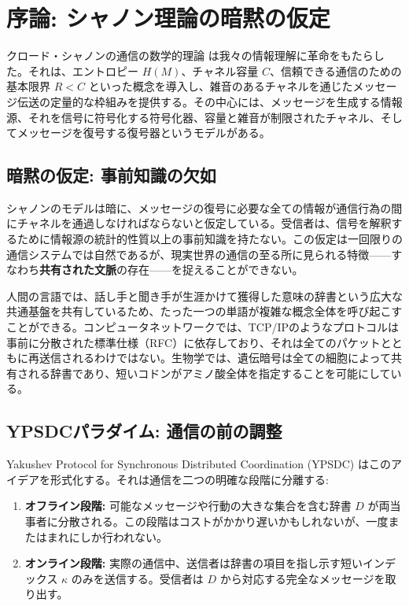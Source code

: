 \documentclass[12pt,a4paper]{article}
\theoremstyle{definition}
\theoremstyle{remark}
\begin{document}
	\section{序論: シャノン理論の暗黙の仮定}
	\label{sec:intro}
	
	クロード・シャノンの通信の数学的理論 \cite{Shannon1948} は我々の情報理解に革命をもたらした。それは、エントロピー $H(M)$、チャネル容量 $C$、信頼できる通信のための基本限界 $R < C$ といった概念を導入し、雑音のあるチャネルを通じたメッセージ伝送の定量的な枠組みを提供する。その中心には、メッセージを生成する情報源、それを信号に符号化する符号化器、容量と雑音が制限されたチャネル、そしてメッセージを復号する復号器というモデルがある。
	
	\subsection{暗黙の仮定: 事前知識の欠如}
	
	シャノンのモデルは暗に、メッセージの復号に必要な全ての情報が通信行為の間にチャネルを通過しなければならないと仮定している。受信者は、信号を解釈するために情報源の統計的性質以上の事前知識を持たない。この仮定は一回限りの通信システムでは自然であるが、現実世界の通信の至る所に見られる特徴——すなわち\textbf{共有された文脈}の存在——を捉えることができない。
	
	人間の言語では、話し手と聞き手が生涯かけて獲得した意味の辞書という広大な共通基盤を共有しているため、たった一つの単語が複雑な概念全体を呼び起こすことができる。コンピュータネットワークでは、TCP/IPのようなプロトコルは事前に分散された標準仕様（RFC）に依存しており、それは全てのパケットとともに再送信されるわけではない。生物学では、遺伝暗号は全ての細胞によって共有される辞書であり、短いコドンがアミノ酸全体を指定することを可能にしている。
	
	\subsection{YPSDCパラダイム: 通信の前の調整}
	
	Yakushev Protocol for Synchronous Distributed Coordination (YPSDC) \cite{Yakushev2026a, AppendixB} はこのアイデアを形式化する。それは通信を二つの明確な段階に分離する:
	\begin{enumerate}
		\item \textbf{オフライン段階:} 可能なメッセージや行動の大きな集合を含む辞書 $D$ が両当事者に分散される。この段階はコストがかかり遅いかもしれないが、一度またはまれにしか行われない。
		\item \textbf{オンライン段階:} 実際の通信中、送信者は辞書の項目を指し示す短いインデックス $\kappa$ のみを送信する。受信者は $D$ から対応する完全なメッセージを取り出す。
	\end{enumerate}
	
\end{document}
